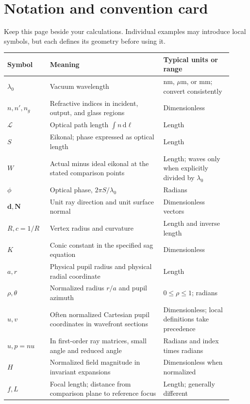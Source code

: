 \chapter*{Notation and convention card}
Keep this page beside your calculations. Individual examples may introduce local symbols, but each defines its geometry before using it.

\renewcommand{\arraystretch}{1.05}
\begin{longtable}{@{}>{\raggedright\arraybackslash}p{0.17\linewidth}>{\raggedright\arraybackslash}p{0.46\linewidth}>{\raggedright\arraybackslash}p{0.29\linewidth}@{}}
\toprule
Symbol & Meaning & Typical units or range \\
\midrule
\endhead
$\lambda_0$ & Vacuum wavelength & nm, $\mu$m, or mm; convert consistently \\
$n,n',n_g$ & Refractive indices in incident, output, and glass regions & Dimensionless \\
$\mathcal{L}$ & Optical path length $\int n\,\mathrm{d}\ell$ & Length \\
$S$ & Eikonal; phase expressed as optical length & Length \\
$W$ & Actual minus ideal eikonal at the stated comparison points & Length; waves only when explicitly divided by $\lambda_0$ \\
$\phi$ & Optical phase, $2\pi S/\lambda_0$ & Radians \\
$\bm{d},\bm{N}$ & Unit ray direction and unit surface normal & Dimensionless vectors \\
$R,c=1/R$ & Vertex radius and curvature & Length and inverse length \\
$K$ & Conic constant in the specified sag equation & Dimensionless \\
$a,r$ & Physical pupil radius and physical radial coordinate & Length \\
$\rho,\theta$ & Normalized radius $r/a$ and pupil azimuth & $0\leq\rho\leq1$; radians \\
$u,v$ & Often normalized Cartesian pupil coordinates in wavefront sections & Dimensionless; local definitions take precedence \\
$u,p=nu$ & In first-order ray matrices, small angle and reduced angle & Radians and index times radians \\
$H$ & Normalized field magnitude in invariant expansions & Dimensionless when normalized \\
$f,L$ & Focal length; distance from comparison plane to reference focus & Length; generally different \\

\end{longtable}
